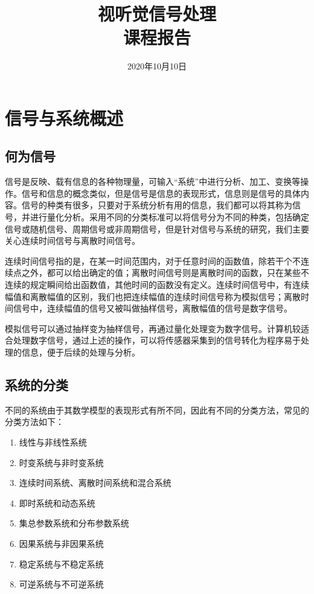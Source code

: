 \documentclass{hitreport}
\title{视听觉信号处理\\课程报告}
\date{2020年10月10日}
\begin{document}
\maketitle

\tableofcontents
\newpage
\section{信号与系统概述}

\subsection{何为信号}
信号是反映、载有信息的各种物理量，可输入“系统”中进行分析、加工、变换等操作。信号和信息的概念类似，但是信号是信息的表现形式，信息则是信号的具体内容。信号的种类有很多，只要对于系统分析有用的信息，我们都可以将其称为信号，并进行量化分析。采用不同的分类标准可以将信号分为不同的种类，包括确定信号或随机信号、周期信号或非周期信号，但是针对信号与系统的研究，我们主要关心连续时间信号与离散时间信号。

连续时间信号指的是，在某一时间范围内，对于任意时间的函数值，除若干个不连续点之外，都可以给出确定的值；离散时间信号则是离散时间的函数，只在某些不连续的规定瞬间给出函数值，其他时间的函数没有定义。连续时间信号中，有连续幅值和离散幅值的区别，我们也把连续幅值的连续时间信号称为模拟信号；离散时间信号中，连续幅值的信号又被叫做抽样信号，离散幅值的信号是数字信号。

模拟信号可以通过抽样变为抽样信号，再通过量化处理变为数字信号。计算机较适合处理数字信号，通过上述的操作，可以将传感器采集到的信号转化为程序易于处理的信息，便于后续的处理与分析。

\subsection{系统的分类}

不同的系统由于其数学模型的表现形式有所不同，因此有不同的分类方法，常见的分类方法如下：

\begin{enumerate}
\item 线性与非线性系统
\item 时变系统与非时变系统
\item 连续时间系统、离散时间系统和混合系统
\item 即时系统和动态系统
\item 集总参数系统和分布参数系统
\item 因果系统与非因果系统
\item 稳定系统与不稳定系统
\item 可逆系统与不可逆系统
\end{enumerate}
\end{document}
